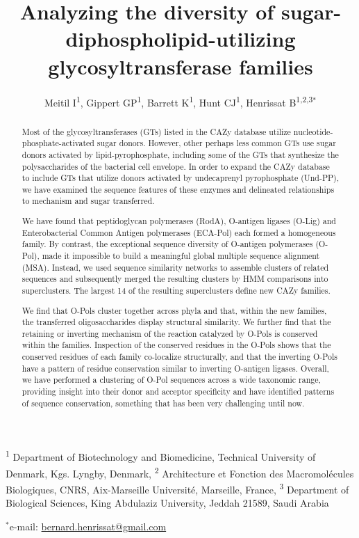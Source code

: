 \documentclass{article}
\title{Analyzing the diversity of sugar-diphospholipid-utilizing glycosyltransferase families}
\author{Meitil I\textsuperscript{1}, Gippert GP\textsuperscript{1}, Barrett K\textsuperscript{1}, Hunt CJ\textsuperscript{1}, Henrissat B\textsuperscript{1,2,3}$^{\ast}$}
\begin{document}
\maketitle

\noindent\textsuperscript{1} Department of Biotechnology and Biomedicine, Technical University of Denmark, Kgs. Lyngby, Denmark,
\textsuperscript{2} Architecture et Fonction des Macromolécules Biologiques, CNRS, Aix-Marseille Université, Marseille, France,
\textsuperscript{3} Department of Biological Sciences, King Abdulaziz University, Jeddah 21589, Saudi Arabia

\noindent$^{\ast}$e-mail: \url{bernard.henrissat@gmail.com}

\begin{abstract}
Most of the glycosyltransferases (GTs) listed in the CAZy database utilize nucleotide-phosphate-activated sugar donors. However, other perhaps less common GTs use sugar donors activated by lipid-pyrophosphate, including some of the GTs that synthesize the polysaccharides of the bacterial cell envelope. In order to expand the CAZy database to include GTs that utilize donors activated by undecaprenyl pyrophosphate (Und-PP), we have examined the sequence features of these enzymes and delineated relationships to mechanism and sugar transferred.

We have found that peptidoglycan polymerases (RodA), O-antigen ligases (O-Lig) and Enterobacterial Common Antigen polymerases (ECA-Pol) each formed a homogeneous family. By contrast, the exceptional sequence diversity of O-antigen polymerases (O-Pol), made it impossible to build a meaningful global multiple sequence alignment (MSA). Instead, we used sequence similarity networks to assemble clusters of related sequences and subsequently merged the resulting clusters by HMM comparisons into superclusters. The largest 14 of the resulting superclusters define new CAZy families.

We find that O-Pols cluster together across phyla and that, within the new families, the transferred oligosaccharides display structural similarity. We further find that the retaining or inverting mechanism of the reaction catalyzed by O-Pols is conserved within the families. Inspection of the conserved residues in the O-Pols shows that the conserved residues of each family co-localize structurally, and that the inverting O-Pols have a pattern of residue conservation similar to inverting O-antigen ligases. Overall, we have performed a clustering of O-Pol sequences across a wide taxonomic range, providing insight into their donor and acceptor specificity and have identified patterns of sequence conservation, something that has been very challenging until now.

\end{abstract}
\end{document}

